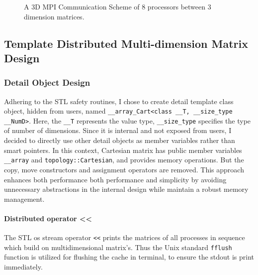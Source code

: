 \begin{figure}[htbp]
  \caption{A 3D MPI Communication Scheme of $8$ processors between $3$ dimension matrices.}
  \label{FIG_MPI_3D_Example_SCHEME}
\end{figure}


\subsection{Template Distributed Multi-dimension Matrix Design}\label{SEC:SUB:Distributed_Matrix_Design}
\subsubsection{Detail Object Design}
Adhering to the STL safety routines, I chose to create detail template class object, hidden from users,
named \texttt{\_\_array\_Cart<class \_\_T, \_\_size\_type \_\_NumD>}.
Here, the \texttt{\_\_T} represents the value type, \texttt{\_\_size\_type} specifies the type of number of dimensions.
Since it is internal and not exposed from users, I decided to directly use other detail objects as member variables rather than 
smart pointers.
In this context, Cartesian matrix has public member variables \texttt{\_\_array} and \texttt{topology::Cartesian},
and provides memory operations. 
But the copy, move constructors and assignment operators are removed.
This approach enhances both performance both performance and simplicity by avoiding unnecessary abstractions in the internal design 
while maintain a robust memory management.

\paragraph{Distributed operator <<}
The STL os stream operator \texttt{<<} prints the matrices of all processes in sequence which build on multidimensional matrix's. 
Thus the Unix standard \texttt{fflush} function is utilized for flushing the cache in terminal, to ensure the stdout is print immediately.

